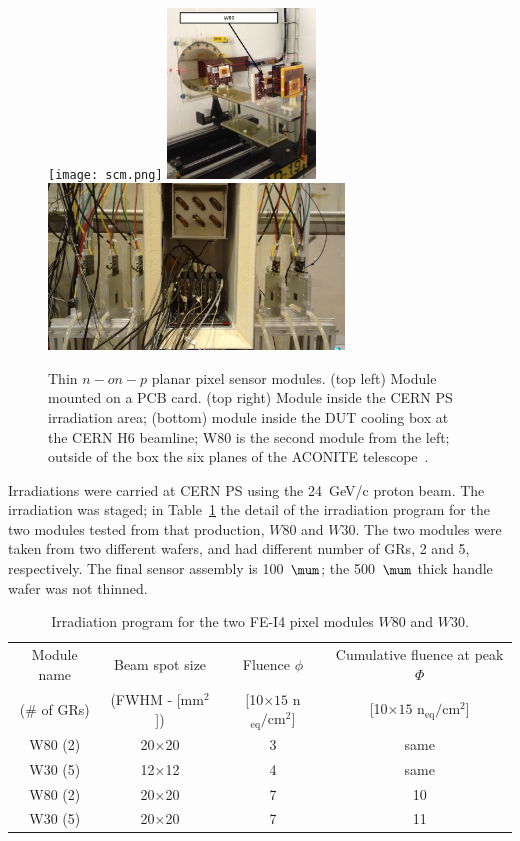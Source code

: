 \begin{figure}[!htpb]
\centering
\texttt{[image: scm.png]}
\includegraphics[width=0.35\textwidth]{w80_irrad1.png}
\includegraphics[width=0.70\textwidth]{in_the_box.jpeg}
\caption{\label{fig:W80W30}Thin $n-on-p$ planar pixel sensor modules. (top left) Module mounted 
on a PCB card. (top right) Module inside the CERN PS irradiation area; (bottom) module inside 
the DUT cooling box at the CERN H6 beamline; W80 is the second module from the left; outside 
of the box the six planes of the ACONITE telescope~\cite{Jansen2016}.}
\end{figure}

Irradiations were carried at CERN PS using the 24~GeV/c proton beam. The irradiation was staged; 
in Table~\ref{tab:W30W80Irr} the detail of the irradiation program for the two modules tested from 
that production, $W80$ and $W30$. The two modules were taken from two different wafers, 
and had different number of GRs,  2 and 5, respectively. The final sensor assembly 
is 100~$\mum$; the 500~$\mum$  thick handle wafer was not thinned.

\begin{table}[!htpb]
\caption{\label{tab:W30W80Irr}Irradiation program for the two FE-I4 pixel modules $W80$ and $W30$.}
\centering
\begin{tabular}{cccc}
\hline 
\hline
Module name & Beam spot size & Fluence $\phi$& Cumulative fluence at  peak $\Phi$\\ 
(\# of GRs) & (FWHM - [mm$^2$]) &  [10$\times{15}$ n$_\text{eq}/\text{cm}^2$]  &  [10$\times{15}$ n$_\text{eq}/\text{cm}^2$] \\
\hline
W80 (2) & 20$\times$20 & 3 & same\\
\hline
W30 (5) & 12$\times$12 & 4 & same\\
\hline
\hline
W80 (2) & 20$\times$20 & 7 & 10 \\
\hline
W30 (5) & 20$\times$20 & 7 & 11\\
\hline
\end{tabular}
\end{table}

